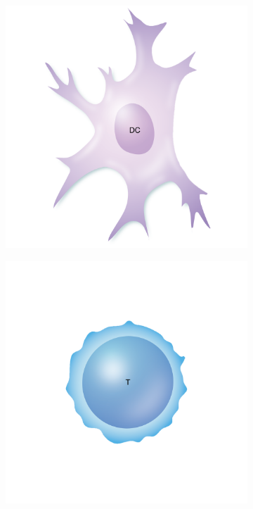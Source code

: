 \documentclass{l4proj}
\begin{document}
\begin{figure}[h]
    \centering
    \begin{subfigure}[h!]{0.3\textwidth}
        \includegraphics[width=\textwidth]{dissertation/figures/model_DC.png}
    \end{subfigure}
    \begin{subfigure}[h!]{0.3\textwidth}
        \includegraphics[width=\textwidth]{dissertation/figures/model_Tcell.png}

\end{subfigure}
\end{figure}
\end{document}
